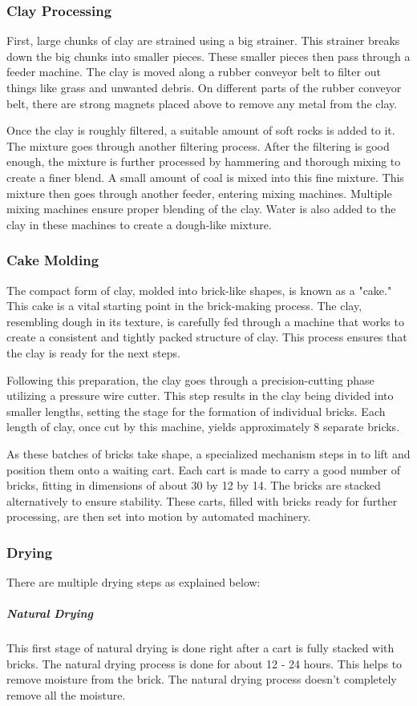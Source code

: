 \subsubsection{Clay Processing}
First, large chunks of clay are strained using a big strainer. This strainer breaks down the big chunks into smaller pieces. These smaller pieces then pass through a feeder machine. The clay is moved along a rubber conveyor belt to filter out things like grass and unwanted debris. On different parts of the rubber conveyor belt, there are strong magnets placed above to remove any metal from the clay.

Once the clay is roughly filtered, a suitable amount of soft rocks is added to it. The mixture goes through another filtering process. After the filtering is good enough, the mixture is further processed by hammering and thorough mixing to create a finer blend. A small amount of coal is mixed into this fine mixture. This mixture then goes through another feeder, entering mixing machines. Multiple mixing machines ensure proper blending of the clay. Water is also added to the clay in these machines to create a dough-like mixture.

\subsubsection{Cake Molding}
The compact form of clay, molded into brick-like shapes, is known as a "cake." This cake is a vital starting point in the brick-making process. The clay, resembling dough in its texture, is carefully fed through a machine that works to create a consistent and tightly packed structure of clay. This process ensures that the clay is ready for the next steps.

Following this preparation, the clay goes through a precision-cutting phase utilizing a pressure wire cutter. This step results in the clay being divided into smaller lengths, setting the stage for the formation of individual bricks. Each length of clay, once cut by this machine, yields approximately 8 separate bricks.

As these batches of bricks take shape, a specialized mechanism steps in to lift and position them onto a waiting cart. Each cart is made to carry a good number of bricks, fitting in dimensions of about 30 by 12 by 14. The bricks are stacked alternatively to ensure stability. These carts, filled with bricks ready for further processing, are then set into motion by automated machinery.

\subsubsection{Drying}
There are multiple drying steps as explained below:
\subparagraph{Natural Drying}
\begin{adjustwidth}{1.5em}{0em}
\vspace{0.1cm}
  This first stage of natural drying is done right after a cart is fully stacked with bricks. The natural drying process is done for about 12 - 24 hours. This helps to remove moisture from the brick. The natural drying process doesn't completely remove all the moisture.
\end{adjustwidth}




